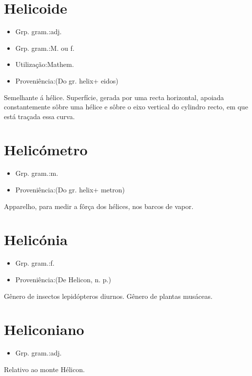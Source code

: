 \documentclass{article}
\begin{document}
\section{Helicoide}
\begin{itemize}
\item {Grp. gram.:adj.}
\end{itemize}
\begin{itemize}
\item {Grp. gram.:M.  ou  f.}
\end{itemize}
\begin{itemize}
\item {Utilização:Mathem.}
\end{itemize}
\begin{itemize}
\item {Proveniência:(Do gr. \textunderscore helix\textunderscore  + \textunderscore eidos\textunderscore )}
\end{itemize}
Semelhante á hélice.
Superfície, gerada por uma recta horizontal, apoiada constantemente sôbre uma hélice e sôbre o eixo vertical do cylindro recto, em que está traçada essa curva.
\section{Helicómetro}
\begin{itemize}
\item {Grp. gram.:m.}
\end{itemize}
\begin{itemize}
\item {Proveniência:(Do gr. \textunderscore helix\textunderscore  + \textunderscore metron\textunderscore )}
\end{itemize}
Apparelho, para medir a fôrça dos hélices, nos barcos de vapor.
\section{Helicónia}
\begin{itemize}
\item {Grp. gram.:f.}
\end{itemize}
\begin{itemize}
\item {Proveniência:(De \textunderscore Helicon\textunderscore , n. p.)}
\end{itemize}
Gênero de insectos lepidópteros diurnos.
Gênero de plantas musáceas.
\section{Heliconiano}
\begin{itemize}
\item {Grp. gram.:adj.}
\end{itemize}
Relativo ao monte Hélicon.
\end{document}
